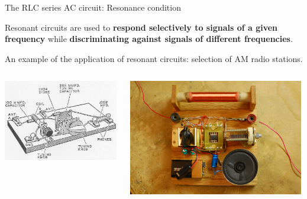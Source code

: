 \begin{frame}{The RLC series AC circuit: Resonance condition}

Resonant circuits are used to {\bf respond selectively to signals of a given
frequency} while {\bf discriminating against signals of different frequencies}.\\

\vspace{0.2cm}

An example of the application of resonant circuits: selection of AM radio stations.

\begin{columns}
  \begin{column}{0.50\textwidth}
    \begin{center}
     \includegraphics[width=0.99\textwidth]{./images/schematics/am_radio.png}\\
     \end{center}
  \end{column}
  \begin{column}{0.50\textwidth}
    \begin{center}
     \includegraphics[width=0.99\textwidth]{./images/photos/am_radio.jpg}\\
     \end{center}
  \end{column}
\end{columns}

\end{frame}


